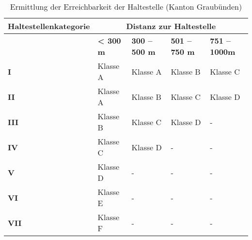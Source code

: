 \begin{table}[ht]
    \begin{tabular}[c]{l p{2.5cm} p{2.5cm} p{2.5cm} p{2.5cm}}
        \toprule
        \textbf{Haltestellenkategorie}
                                & \multicolumn{4}{c}{\textbf{Distanz zur Haltestelle}}\\
        \midrule
        \textbf{}
                                & \textbf{< 300 m}
                                & \textbf{300 -- 500 m}
                                & \textbf{501 -- 750 m}
                                & \textbf{751 -- 1000m}\\
        \textbf{I}
                                & Klasse A
                                & Klasse A
                                & Klasse B
                                & Klasse C\\
        \textbf{II}
                                & Klasse A
                                & Klasse B
                                & Klasse C
                                & Klasse D\\
        \textbf{III}
                                & Klasse B
                                & Klasse C
                                & Klasse D
                                & -\\
        \textbf{IV}
                                & Klasse C
                                & Klasse D
                                & -
                                & -\\
        \textbf{V}
                                & Klasse D
                                & -
                                & -
                                & -\\
        \cellcolor{red!25}\textbf{VI}
                                & \cellcolor{red!25}Klasse E
                                & -
                                & -
                                & -\\
        \cellcolor{red!25}\textbf{VII}
                                & \cellcolor{red!25}Klasse F
                                & -
                                & -
                                & -\\                                
        \bottomrule
    \end{tabular}
    \caption{Ermittlung der Erreichbarkeit der Haltestelle (Kanton Graubünden)}
    \label{table:Ermittlung Erreichbarkeit der Haltestelle (Kanton Graubünden)}
\end{table}

